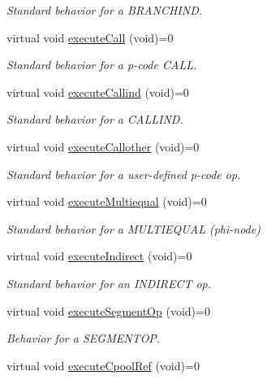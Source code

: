\begin{DoxyCompactItemize}
\begin{DoxyCompactList}\small\item\em Standard behavior for a B\+R\+A\+N\+C\+H\+I\+ND. \end{DoxyCompactList}\item 
virtual void \mbox{\hyperlink{class_emulate_abdb4b20ec872310aba005d54813c35ce}{execute\+Call}} (void)=0
\begin{DoxyCompactList}\small\item\em Standard behavior for a p-\/code C\+A\+LL. \end{DoxyCompactList}\item 
virtual void \mbox{\hyperlink{class_emulate_aa3579bd388004b72fab0e62175aeb1a0}{execute\+Callind}} (void)=0
\begin{DoxyCompactList}\small\item\em Standard behavior for a C\+A\+L\+L\+I\+ND. \end{DoxyCompactList}\item 
virtual void \mbox{\hyperlink{class_emulate_ab60a8c9f009c0ce388bb2b6eef50a50b}{execute\+Callother}} (void)=0
\begin{DoxyCompactList}\small\item\em Standard behavior for a user-\/defined p-\/code op. \end{DoxyCompactList}\item 
virtual void \mbox{\hyperlink{class_emulate_ab98cf68b6d37869f65825f3fdf03019c}{execute\+Multiequal}} (void)=0
\begin{DoxyCompactList}\small\item\em Standard behavior for a M\+U\+L\+T\+I\+E\+Q\+U\+AL (phi-\/node) \end{DoxyCompactList}\item 
virtual void \mbox{\hyperlink{class_emulate_aa791523787e5154d73bfe0e846a2cd38}{execute\+Indirect}} (void)=0
\begin{DoxyCompactList}\small\item\em Standard behavior for an I\+N\+D\+I\+R\+E\+CT op. \end{DoxyCompactList}\item 
virtual void \mbox{\hyperlink{class_emulate_ac4c13159c340cd33ca6f3b69d2b50e38}{execute\+Segment\+Op}} (void)=0
\begin{DoxyCompactList}\small\item\em Behavior for a S\+E\+G\+M\+E\+N\+T\+OP. \end{DoxyCompactList}\item 
virtual void \mbox{\hyperlink{class_emulate_a544e0f87351d29a0336b56c06fe8b3c3}{execute\+Cpool\+Ref}} (void)=0

\end{DoxyCompactItemize}

